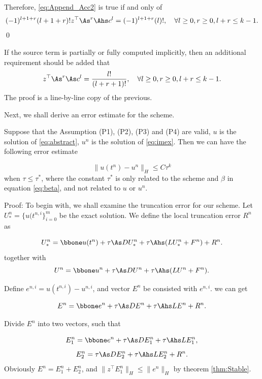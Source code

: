 Therefore, \eqref{eq:Append_Acc2} is true if and only of
$$(-1)^{l+1+r}(l+1+r)!z^\top\As^r\Ahs c^l = (-1)^{l+1+r}(l)!, \quad \forall l\geq 0, r\geq 0, l+r\leq k-1. $$
\qed

\begin{remark}
    If the source term is partially or fully computed implicitly, 
    then an additional requirement should be added that 
    \begin{equation*}
        z^\top\As^r\As c^l = \frac{l!}{(l+r+1)!}, \quad \forall l\geq 0, r\geq 0, l+r\leq k-1.
    \end{equation*}
The proof is a line-by-line copy of the previous. 
\end{remark}

Next, we shall derive an error estimate for the scheme. 
\begin{theorem}
    Suppose that the Assumption (P1), (P2), (P3) and (P4) are valid,  
    $u$ is the solution of \ref{eq:abstract}, $u^n$ is the solution of \ref{eq:imex}. 
    Then we can have the following error estimate

    $$\|u(t^n) - u^n\|_H \leq C\tau^k$$
    when $\tau \leq \tau^*$, 
    where the constant $\tau^*$ is only 
    related to the scheme and $\beta$ in equation \eqref{eq:beta}, 
    and not related to $u$ or $u^n$.
\end{theorem}
Proof: To begin with, we shall examine the truncation error for our scheme. 
Let $U_*^n = \{u(t^{n,i}\}_{i=0}^{m}$ be the exact solution. 
We define the local truncation error $R^n$ as 


\begin{equation}\label{eq:LocTrun}
U_*^n = \bbone u(t^n) + \tau \As D U_*^n + \tau \Ahs (L U_*^n + F^n) + R^n. 
\end{equation}
together with 
\begin{equation}
U^n = \bbone u^n + \tau \As D U^n + \tau \Ahs (L U^n + F^n). 
\end{equation}

Define $e^{n,i} = u(t^{n,i}) - u^{n,i}$, and vector $E^n$ be consisted with $e^{n,i}$. we can get

$$E^n = \bbone e^n + \tau \As D E^n + \tau \Ahs L E^n + R^n. $$

Divide $E^n$ into two vectors, such that 

$$E_1^n = \bbone e^n + \tau \As D E_1^n + \tau\Ahs L E_1^n, $$
$$E_2^n =  \tau \As D E_2^n + \tau\Ahs L E_2^n + R^n.$$
Obviously $E^n = E_1^n + E_2^n$, and 
$\|z^\top E_1^n \|_H \leq \|e^n\|_H$ by theorem \ref{thm:Stable}. 

